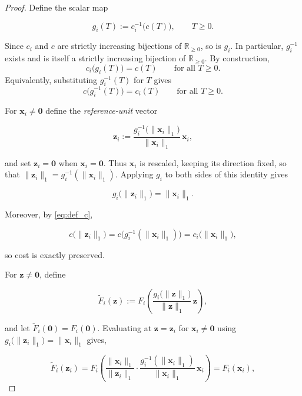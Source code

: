 \begin{proof}
Define the scalar map

$$
g_i(T) := c_i^{-1}\big(c(T)\big), \qquad T\ge 0.
$$

Since $c_i$ and $c$ are strictly increasing bijections of $\mathbb{R}_{\ge 0}$, so is $g_i$. In particular, $g_i^{-1}$ exists and is itself a strictly increasing bijection of $\mathbb{R}_{\ge 0}$. By construction,
\begin{equation}
c_i\big(g_i(T)\big) = c(T) \qquad \text{for all } T\ge 0. \label{eq:def_c_i}
\end{equation}
Equivalently, substituting $g_i^{-1}(T)$ for $T$ gives
\begin{equation}
c\big(g_i^{-1}(T)\big) = c_i(T) \qquad \text{for all } T\ge 0. \label{eq:def_c}
\end{equation}

For $\mathbf{x}_i \neq \mathbf{0}$ define the \emph{reference-unit} vector

$$
\mathbf{z}_i := \frac{g_i^{-1}\big(\lVert \mathbf{x}_i\rVert_1\big)}{\lVert \mathbf{x}_i\rVert_1}\,\mathbf{x}_i,
$$

and set $\mathbf{z}_i=\mathbf{0}$ when $\mathbf{x}_i=\mathbf{0}$. Thus $\mathbf{x}_i$ is rescaled, keeping its direction fixed, so that $\lVert \mathbf{z}_i\rVert_1 = g_i^{-1}(\lVert \mathbf{x}_i\rVert_1)$. Applying $g_i$ to both sides of this identity gives

$$
g_i\big(\lVert \mathbf{z}_i\rVert_1\big) = \lVert \mathbf{x}_i\rVert_1.
$$

Moreover, by \eqref{eq:def_c},

$$
c\big(\lVert \mathbf{z}_i\rVert_1\big) = c\big(g_i^{-1}(\lVert \mathbf{x}_i\rVert_1)\big) = c_i\big(\lVert \mathbf{x}_i\rVert_1\big),
$$

so cost is exactly preserved.

For $\mathbf{z}\neq\mathbf{0}$, define

$$
\tilde{F}_i(\mathbf{z}) := F_i\!\left(\frac{g_i\big(\lVert \mathbf{z}\rVert_1\big)}{\lVert \mathbf{z}\rVert_1}\,\mathbf{z}\right),
$$

and let $\tilde{F}_{i}(\mathbf{0}) = F_{i}(\mathbf{0})$. 
Evaluating at $\mathbf{z}=\mathbf{z}_i$ for $\mathbf{x}_{i} \neq \mathbf{0}$ using $g_i\big(\lVert \mathbf{z}_i\rVert_1\big) = \lVert \mathbf{x}_i\rVert_1
$ gives,

$$
\tilde{F}_i(\mathbf{z}_i) = F_i\!\left(\frac{\lVert \mathbf{x}_i\rVert_1}{\lVert \mathbf{z}_i\rVert_1}\cdot\frac{g_i^{-1}(\lVert \mathbf{x}_i\rVert_1)}{\lVert \mathbf{x}_i\rVert_1}\,\mathbf{x}_i\right) = F_i(\mathbf{x}_i),
$$


\end{proof}
